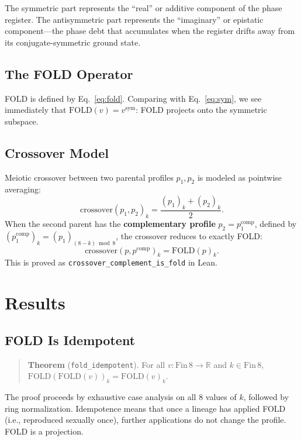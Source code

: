 \documentclass[11pt,twocolumn]{article}
\begin{document}
The symmetric part represents the ``real'' or additive component of the
phase register. The antisymmetric part represents the ``imaginary'' or
epistatic component---the phase debt that accumulates when the register
drifts away from its conjugate-symmetric ground state.

\subsection{The FOLD Operator}

FOLD is defined by Eq.~\eqref{eq:fold}. Comparing with
Eq.~\eqref{eq:sym}, we see immediately that $\mathrm{FOLD}(v) =
v^{\mathrm{sym}}$: FOLD projects onto the symmetric subspace.

\subsection{Crossover Model}

Meiotic crossover between two parental profiles $p_1, p_2$ is modeled
as pointwise averaging:
\begin{equation}\label{eq:crossover}
  \mathrm{crossover}(p_1, p_2)_k = \frac{(p_1)_k + (p_2)_k}{2}.
\end{equation}
When the second parent has the \textbf{complementary profile}
$p_2 = p_1^{\mathrm{comp}}$, defined by
$(p_1^{\mathrm{comp}})_k = (p_1)_{(8-k) \bmod 8}$, the crossover
reduces to exactly FOLD:
\begin{equation}\label{eq:complement}
  \mathrm{crossover}(p, p^{\mathrm{comp}})_k = \mathrm{FOLD}(p)_k.
\end{equation}
This is proved as \texttt{crossover\_complement\_is\_fold} in Lean.

\section{Results}

\subsection{FOLD Is Idempotent}

\begin{quote}
\textbf{Theorem} (\texttt{fold\_idempotent}). For all
$v : \mathrm{Fin}\,8 \to \mathbb{R}$ and $k \in \mathrm{Fin}\,8$,
$\mathrm{FOLD}(\mathrm{FOLD}(v))_k = \mathrm{FOLD}(v)_k$.
\end{quote}

The proof proceeds by exhaustive case analysis on all 8 values of $k$,
followed by ring normalization. Idempotence means that once a lineage
has applied FOLD (i.e., reproduced sexually once), further applications
do not change the profile. FOLD is a projection.
\end{document}
